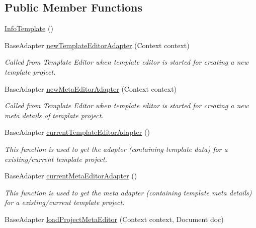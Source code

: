 \subsection*{Public Member Functions}
\begin{DoxyCompactItemize}
\item 
\hyperlink{classorg_1_1buildmlearn_1_1toolkit_1_1templates_1_1InfoTemplate_a3f9f925728b785f52105776cf4ba0e44}{Info\+Template} ()
\item 
Base\+Adapter \hyperlink{classorg_1_1buildmlearn_1_1toolkit_1_1templates_1_1InfoTemplate_ab4d81e3a7da28f406ca3b6e8c74bb69c}{new\+Template\+Editor\+Adapter} (Context context)
\begin{DoxyCompactList}\small\item\em Called from Template Editor when template editor is started for creating a new template project. \end{DoxyCompactList}\item 
Base\+Adapter \hyperlink{classorg_1_1buildmlearn_1_1toolkit_1_1templates_1_1InfoTemplate_a68a769083399e3718f7c596eb7ebb9b3}{new\+Meta\+Editor\+Adapter} (Context context)
\begin{DoxyCompactList}\small\item\em Called from Template Editor when template editor is started for creating a new meta details of template project. \end{DoxyCompactList}\item 
Base\+Adapter \hyperlink{classorg_1_1buildmlearn_1_1toolkit_1_1templates_1_1InfoTemplate_adf457576e88abf2859b9d8cfb8097eba}{current\+Template\+Editor\+Adapter} ()
\begin{DoxyCompactList}\small\item\em This function is used to get the adapter (containing template data) for a existing/current template project. \end{DoxyCompactList}\item 
Base\+Adapter \hyperlink{classorg_1_1buildmlearn_1_1toolkit_1_1templates_1_1InfoTemplate_a39195b6cfa4ef372798370d4391d73bd}{current\+Meta\+Editor\+Adapter} ()
\begin{DoxyCompactList}\small\item\em This function is used to get the meta adapter (containing template meta details) for a existing/current template project. \end{DoxyCompactList}\item 
Base\+Adapter \hyperlink{classorg_1_1buildmlearn_1_1toolkit_1_1templates_1_1InfoTemplate_aaee56466b2da58bc196183c47976b900}{load\+Project\+Meta\+Editor} (Context context, Document doc)

\end{DoxyCompactItemize}
